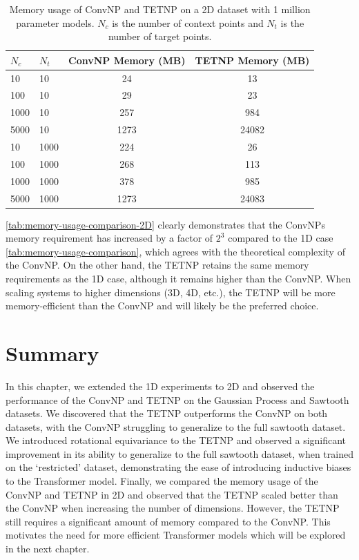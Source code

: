 \documentclass[../../main.tex]{subfiles}
\begin{document}
\begin{table}[H]
    \centering
    \begin{tabular}{@{}llcc@{}}
    \toprule
    $N_c$ & $N_t$ & ConvNP Memory (MB) & TETNP Memory (MB) \\ \midrule
    10    & 10    & 24                 & 13                \\
    100   & 10    & 29                 & 23                \\
    1000  & 10    & 257                & 984               \\
    5000  & 10    & 1273               & 24082             \\ \midrule
    10    & 1000  & 224                & 26                \\
    100   & 1000  & 268                & 113               \\
    1000  & 1000  & 378                & 985               \\
    5000  & 1000  & 1273               & 24083             \\ \bottomrule
    \end{tabular}
    \caption{Memory usage of ConvNP and TETNP on a 2D dataset with 1 million parameter models. $N_c$ is the number of context points and $N_t$ is the number of target points.}
    \label{tab:memory-usage-comparison-2D}
    \end{table}
\FloatBarrier

\autoref{tab:memory-usage-comparison-2D} clearly demonstrates that the ConvNPs memory requirement has increased by a factor of $2^3$ compared to the 1D case \autoref{tab:memory-usage-comparison}, which agrees with the theoretical complexity of the ConvNP. On the other hand, the TETNP retains the same memory requirements as the 1D case, although it remains higher than the ConvNP. When scaling systems to higher dimensions (3D, 4D, etc.), the TETNP will be more memory-efficient than the ConvNP and will likely be the preferred choice.

\section{Summary}

In this chapter, we extended the 1D experiments to 2D and observed the performance of the ConvNP and TETNP on the Gaussian Process and Sawtooth datasets. We discovered that the TETNP outperforms the ConvNP on both datasets, with the ConvNP struggling to generalize to the full sawtooth dataset. We introduced rotational equivariance to the TETNP and observed a significant improvement in its ability to generalize to the full sawtooth dataset, when trained on the `restricted' dataset, demonstrating the ease of introducing inductive biases to the Transformer model. Finally, we compared the memory usage of the ConvNP and TETNP in 2D and observed that the TETNP scaled better than the ConvNP when increasing the number of dimensions. However, the TETNP still requires a significant amount of memory compared to the ConvNP. This motivates the need for more efficient Transformer models which will be explored in the next chapter. 


\ifSubfilesClassLoaded{%
    \printbibliography{}
}{} 
\end{document}
